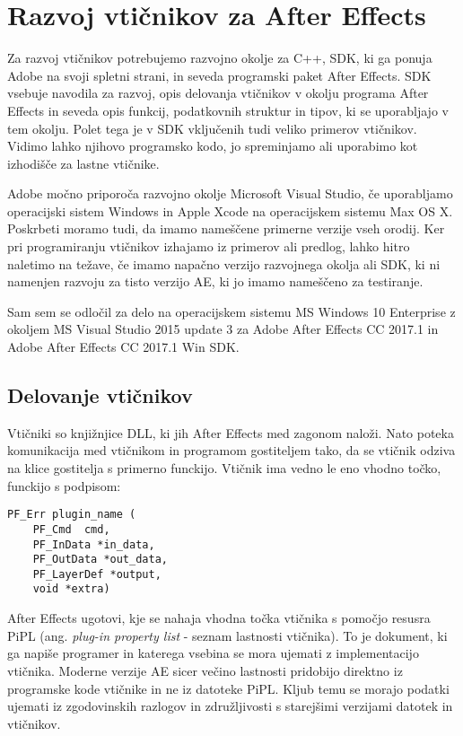\documentclass[a4paper, 12pt]{book}
\begin{document}
\chapter{Razvoj vtičnikov za After Effects}

Za razvoj vtičnikov potrebujemo razvojno okolje za C++, SDK, ki ga ponuja Adobe na svoji spletni strani, in seveda programski paket After Effects. 
SDK vsebuje navodila za razvoj, opis delovanja vtičnikov v okolju programa After Effects in seveda opis funkcij, podatkovnih struktur in tipov, ki se uporabljajo v tem okolju. 
Polet tega je v SDK vključenih tudi veliko primerov vtičnikov. 
Vidimo lahko njihovo programsko kodo, jo spreminjamo ali uporabimo kot izhodišče za lastne vtičnike.

Adobe močno priporoča razvojno okolje Microsoft Visual Studio, če uporabljamo operacijski sistem Windows in Apple Xcode na operacijskem sistemu Max OS X. 
Poskrbeti moramo tudi, da imamo nameščene primerne verzije vseh orodij. 
Ker pri programiranju vtičnikov izhajamo iz primerov ali predlog, lahko hitro naletimo na težave, če imamo napačno verzijo razvojnega okolja ali SDK, ki ni namenjen razvoju za tisto verzijo AE, ki jo imamo nameščeno za testiranje.

Sam sem se odločil za delo na operacijskem sistemu MS Windows 10 Enterprise z okoljem MS Visual Studio 2015 update 3 za Adobe After Effects CC 2017.1 in Adobe After Effects CC 2017.1 Win SDK. 


\section{Delovanje vtičnikov}
Vtičniki so knjižnjice DLL, ki jih After Effects med zagonom naloži. 
Nato poteka komunikacija med vtičnikom in programom gostiteljem tako, da se vtičnik odziva na klice gostitelja s primerno funckijo. 
Vtičnik ima vedno le eno vhodno točko, funckijo s podpisom:
\begin{verbatim}
PF_Err plugin_name (
    PF_Cmd	cmd,
    PF_InData *in_data,
    PF_OutData *out_data,
    PF_LayerDef *output,
    void *extra)
\end{verbatim}

After Effects ugotovi, kje se nahaja vhodna točka vtičnika s pomočjo resusra PiPL (ang. {\it plug-in property list} - seznam lastnosti vtičnika).
To je dokument, ki ga napiše programer in katerega vsebina se mora ujemati z implementacijo vtičnika. 
Moderne verzije AE sicer večino lastnosti pridobijo direktno iz programske kode vtičnike in ne iz datoteke PiPL. 
Kljub temu se morajo podatki ujemati iz zgodovinskih razlogov in združljivosti s starejšimi verzijami datotek in vtičnikov. 
\end{document}
